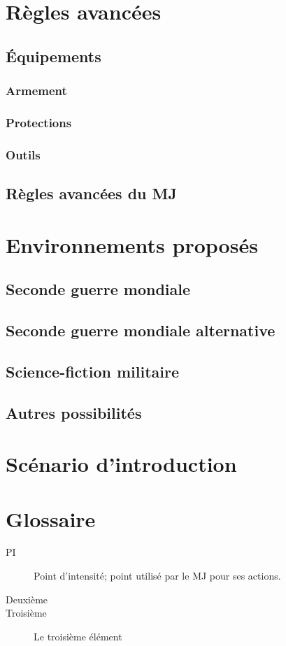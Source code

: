 \documentclass[twocolumn]{report}
\begin{document}
\chapter{Règles avancées}
\section{Équipements}
\subsection{Armement}
\subsection{Protections}
\subsection{Outils}
\section{Règles avancées du MJ}
\chapter{Environnements proposés}
\section{Seconde guerre mondiale}
\section{Seconde guerre mondiale alternative}
\section{Science-fiction militaire}
\section{Autres possibilités}
\chapter{Scénario d'introduction}

\chapter*{Glossaire}
\begin{description}
  \item[PI] Point d'intensité; point utilisé par le MJ pour ses actions.
  \item[Deuxième] 
  \item[Troisième] Le troisième élément
\end{description}
\end{document}
